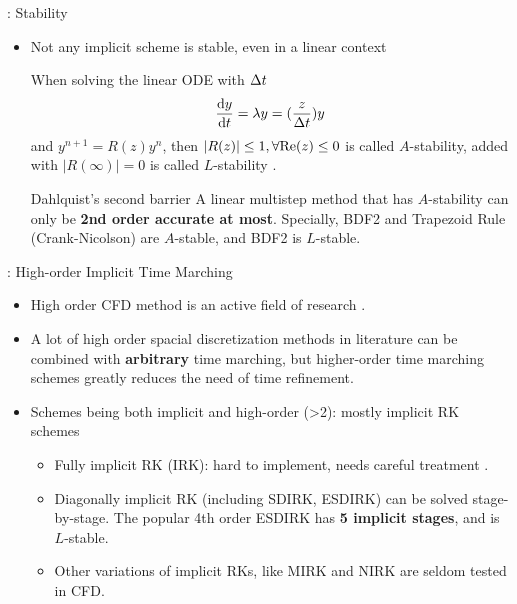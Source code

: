 \documentclass[aspectratio=169,serif]{beamer} %
\begin{document}
\begin{frame}{\secname: Stability}
  \begin{itemize}
    \item Not any implicit scheme is stable,
          even in a linear context
          \begin{block}{}
            When solving the linear ODE with ${\Delta} t$
            $$
              \dv{y}{t} = \lambda y = (\frac{z}{{\Delta} t})y
            $$
            and $y^{n+1}=R(z) y^{n}$, then $|R(z)|\leq1, \forall \mathrm{Re}(z)\leq 0$ is
            called $A$-stability, added with $|R(\infty)|=0$ is called $L$-stability
            \cite{wanner1996solving}.
          \end{block}
          \begin{block}{Dahlquist's second barrier
              \cite{dahlquist1963special}}
            A linear multistep method that has $A$-stability
            can only be {\bf 2nd order accurate at most}.
            Specially, BDF2 and Trapezoid Rule (Crank-Nicolson)
            are $A$-stable, and BDF2 is $L$-stable.
          \end{block}
  \end{itemize}
\end{frame}

\begin{frame}{\secname: High-order Implicit Time Marching}
  \begin{itemize}
    \item High order CFD method is an active field of research
          \cite{cheng2009highHOReview}.
    \item A lot of high order spacial discretization
          methods in literature can be combined
          with {\bf arbitrary} time marching, but higher-order
          time marching schemes greatly reduces the need of time refinement.
    \item Schemes being both implicit and high-order (>2): mostly implicit RK schemes
          \begin{itemize}
            \item Fully implicit RK (IRK): hard to implement,
                  needs careful treatment \cite{pazner2017stage,jameson2017evaluation}.
            \item Diagonally implicit RK
                  (including SDIRK, ESDIRK) can be solved stage-by-stage.
                  The popular 4th order ESDIRK \cite{kennedy2003additiveARK,kvaerno2004singly}
                  has {\bf 5 implicit stages}, and is $L$-stable.
            \item Other variations of implicit RKs, like MIRK and NIRK
                  \cite{cash1975classMIRKOrig,kulikov2006familyNIRKOrig}
                  are seldom tested in CFD.
          \end{itemize}
  \end{itemize}
\end{frame}
\end{document}
